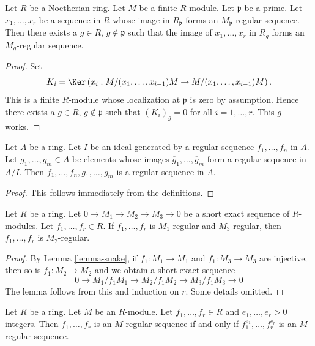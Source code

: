 \begin{lemma}
\label{lemma-regular-sequence-in-neighbourhood}
Let $R$ be a Noetherian ring. Let $M$ be a finite $R$-module.
Let $\mathfrak p$ be a prime. Let $x_1, \ldots, x_r$ be a sequence
in $R$ whose image in $R_{\mathfrak p}$ forms an $M_{\mathfrak p}$-regular
sequence. Then there exists a $g \in R$, $g \not \in \mathfrak p$
such that the image of $x_1, \ldots, x_r$ in $R_g$ forms
an $M_g$-regular sequence.
\end{lemma}

\begin{proof}
Set
$$
K_i = \Ker\left(x_i : M/(x_1, \ldots, x_{i - 1})M \to
M/(x_1, \ldots, x_{i - 1})M\right).
$$
This is a finite $R$-module whose localization at $\mathfrak p$ is
zero by assumption. Hence there exists a $g \in R$, $g \not \in \mathfrak p$
such that $(K_i)_g = 0$ for all $i = 1, \ldots, r$. This $g$ works.
\end{proof}

\begin{lemma}
\label{lemma-join-regular-sequences}
Let $A$ be a ring. Let $I$ be an ideal generated by a regular
sequence $f_1, \ldots, f_n$ in $A$. Let $g_1, \ldots, g_m \in A$ be
elements whose images $\overline{g}_1, \ldots, \overline{g}_m$ form a
regular sequence in $A/I$. Then $f_1, \ldots, f_n, g_1, \ldots, g_m$
is a regular sequence in $A$.
\end{lemma}

\begin{proof}
This follows immediately from the definitions.
\end{proof}

\begin{lemma}
\label{lemma-regular-sequence-short-exact-sequence}
Let $R$ be a ring. Let $0 \to M_1 \to M_2 \to M_3 \to 0$
be a short exact sequence of $R$-modules. Let $f_1, \ldots, f_r \in R$.
If $f_1, \ldots, f_r$ is $M_1$-regular and $M_3$-regular, then
$f_1, \ldots, f_r$ is $M_2$-regular.
\end{lemma}

\begin{proof}
By Lemma \ref{lemma-snake}, if $f_1 : M_1 \to M_1$ and
$f_1 : M_3 \to M_3$ are injective, then so is $f_1 : M_2 \to M_2$
and we obtain a short exact sequence
$$
0 \to M_1/f_1M_1 \to M_2/f_1M_2 \to M_3/f_1M_3 \to 0
$$
The lemma follows from this and induction on $r$. Some details omitted.
\end{proof}

\begin{lemma}
\label{lemma-regular-sequence-powers}
Let $R$ be a ring. Let $M$ be an $R$-module.
Let $f_1, \ldots, f_r \in R$ and $e_1, \ldots, e_r > 0$ integers.
Then $f_1, \ldots, f_r$ is an $M$-regular sequence
if and only if $f_1^{e_1}, \ldots, f_r^{e_r}$
is an $M$-regular sequence.
\end{lemma}

